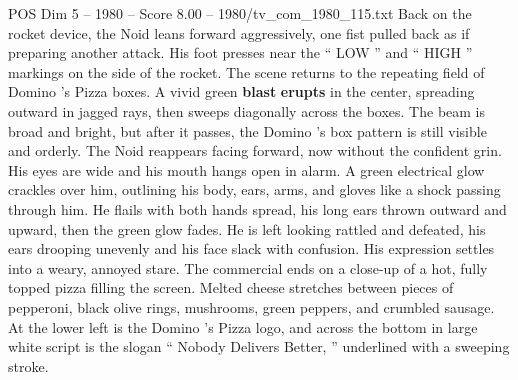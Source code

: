 \begin{textsample}{POS Dim 5 – 1980 – Score 8.00 – 1980/tv\_com\_1980\_115.txt}
Back on the rocket device, the Noid leans forward aggressively, one fist pulled back as if preparing another attack.
His foot presses near the “ LOW ” and “ HIGH ” markings on the side of the rocket.
The scene returns to the repeating field of Domino ’s Pizza boxes.
A vivid green \textbf{blast} \textbf{erupts} in the center, spreading outward in jagged rays, then sweeps diagonally across the boxes.
The beam is broad and bright, but after it passes, the Domino ’s box pattern is still visible and orderly.
The Noid reappears facing forward, now without the confident grin.
His eyes are wide and his mouth hangs open in alarm.
A green electrical glow crackles over him, outlining his body, ears, arms, and gloves like a shock passing through him.
He flails with both hands spread, his long ears thrown outward and upward, then the green glow fades.
He is left looking rattled and defeated, his ears drooping unevenly and his face slack with confusion.
His expression settles into a weary, annoyed stare.
The commercial ends on a close-up of a hot, fully topped pizza filling the screen.
Melted cheese stretches between pieces of pepperoni, black olive rings, mushrooms, green peppers, and crumbled sausage.
At the lower left is the Domino ’s Pizza logo, and across the bottom in large white script is the slogan “ Nobody Delivers Better, ” underlined with a sweeping stroke.

\end{textsample}

